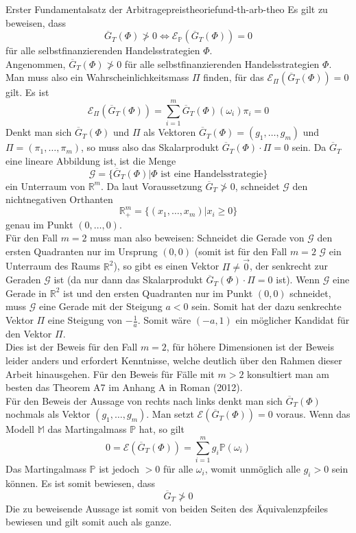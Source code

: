 \documentclass[11pt]{report} %
\begin{document}
\begin{Beweis}{Erster Fundamentalsatz der Arbitragepreistheorie}{fund-th-arb-theo}
    Es gilt zu beweisen, dass $$\overline{G}_T(\Phi)\not>0\Longleftrightarrow\mathcal{E}_{\mathbb{P}}(\overline{G}_T(\Phi))=0$$ für alle selbstfinanzierenden Handelsstrategien $\Phi$.\\Angenommen, $\overline{G}_T(\Phi)\not>0$ für alle selbstfinanzierenden Handelsstrategien $\Phi$. Man muss also ein Wahrscheinlichkeitsmass $\Pi$ finden, für das $\mathcal{E}_{\Pi}(\overline{G}_T(\Phi))=0$ gilt. Es ist $$\mathcal{E}_{\Pi}(\overline{G}_T(\Phi))=\sum_{i=1}^{m}\overline{G}_T(\Phi)(\omega_i)\pi_i=0$$Denkt man sich $\overline{G}_T(\Phi)$ und $\Pi$ als Vektoren $\overline{G}_T(\Phi)=(g_1, \ldots, g_m)$ und $\Pi=(\pi_1, \ldots, \pi_m)$, so muss also das Skalarprodukt $\overline{G}_T(\Phi)\cdot\Pi=0$ sein. Da $\overline{G}_T$ eine lineare Abbildung ist, ist die Menge $$\mathcal{G}=\{\overline{G}_T(\Phi)|\Phi \text{ ist eine Handelsstrategie}\}$$ ein Unterraum von $\mathbb{R}^{m}$. Da laut Voraussetzung $\overline{G}_T\not>0$, schneidet $\mathcal{G}$ den nichtnegativen Orthanten $$\mathbb{R}_{+}^{m}=\{(x_1, \ldots, x_m)|x_i\geq0\}$$ genau im Punkt $(0, \ldots, 0)$.\\
    Für den Fall $m=2$ muss man also beweisen: Schneidet die Gerade von $\mathcal{G}$ den ersten Quadranten nur im Ursprung $(0, 0)$ (somit ist für den Fall $m=2$ $\mathcal{G}$ ein Unterraum des Raums $\mathbb{R}^2$), so gibt es einen Vektor $\Pi\neq\Vec{0}$, der senkrecht zur Geraden $\mathcal{G}$ ist (da nur dann das Skalarprodukt $\overline{G}_T(\Phi)\cdot\Pi=0$ ist). Wenn $\mathcal{G}$ eine Gerade in $\mathbb{R}^2$ ist und den ersten Quadranten nur im Punkt $(0, 0)$ schneidet, muss $\mathcal{G}$ eine Gerade mit der Steigung $a<0$ sein. Somit hat der dazu senkrechte Vektor $\Pi$ eine Steigung von $-\frac{1}{a}$. Somit wäre $(-a, 1)$ ein möglicher Kandidat für den Vektor $\Pi$.\\Dies ist der Beweis für den Fall $m=2$, für höhere Dimensionen ist der Beweis leider anders und erfordert Kenntnisse, welche deutlich über den Rahmen dieser Arbeit hinausgehen. Für den Beweis für Fälle mit $m>2$ konsultiert man am besten das Theorem A7 im Anhang A in Roman (2012).\\
    Für den Beweis der Aussage von rechts nach links denkt man sich $\overline{G}_T(\Phi)$ nochmals als Vektor $(g_1, \ldots, g_m)$. Man setzt $\mathcal{E}(\overline{G}_T(\Phi))=0$ voraus. Wenn das Modell $\mathbb{M}$ das Martingalmass $\mathbb{P}$ hat, so gilt $$0=\mathcal{E}(\overline{G}_T(\Phi))=\sum_{i=1}^{m}g_i\mathbb{P}(\omega_i)$$ Das Martingalmass $\mathbb{P}$ ist jedoch $>0$ für alle $\omega_i$, womit unmöglich alle $g_i >0$ sein können. Es ist somit bewiesen, dass $$\overline{G}_T\not>0$$Die zu beweisende Aussage ist somit von beiden Seiten des Äquivalenzpfeiles bewiesen und gilt somit auch als ganze. 
\end{Beweis}
\end{document}
